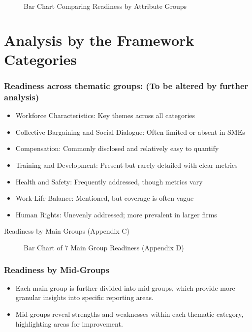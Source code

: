 \begin{figure}[H]
    \centering
    \caption{Bar Chart Comparing Readiness by Attribute Groups}
\end{figure}

\section{Analysis by the Framework Categories}
\subsubsection{Readiness across thematic groups: (To be altered by further analysis)}
\begin{itemize}
    \item Workforce Characteristics: Key themes across all categories
    \item Collective Bargaining and Social Dialogue: Often limited or absent in SMEs
    \item Compensation: Commonly disclosed and relatively easy to quantify
    \item Training and Development: Present but rarely detailed with clear metrics
    \item Health and Safety: Frequently addressed, though metrics vary
    \item Work-Life Balance: Mentioned, but coverage is often vague
    \item Human Rights: Unevenly addressed; more prevalent in larger firms
\end{itemize}

\begin{table}[H]
    \centering
    \caption{Readiness by Main Groups (Appendix C)}
\end{table}

\begin{figure}[H]
    \centering
    \caption{Bar Chart of 7 Main Group Readiness (Appendix D)}
\end{figure}

\subsubsection{Readiness by Mid-Groups}
\begin{itemize}
    \item Each main group is further divided into mid-groups, which provide more granular insights into specific reporting areas.
    \item Mid-groups reveal strengths and weaknesses within each thematic category, highlighting areas for improvement.
\end{itemize}

